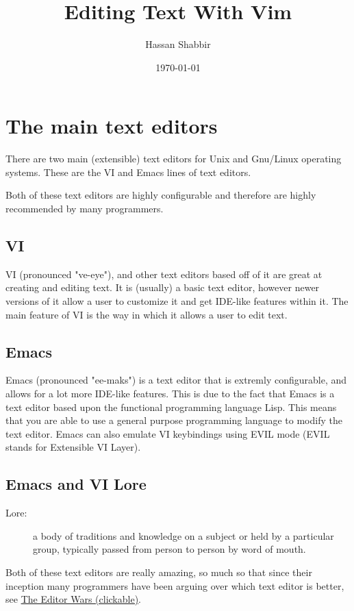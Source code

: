 \documentclass[11pt]{article}
\author{Hassan Shabbir}
\date{\today}
\title{Editing Text With Vim}
\begin{document}
\maketitle
\tableofcontents

\newpage
\section{The main text editors}
\label{sec:org91c0bff}
There are two main (extensible) text editors for Unix and Gnu/Linux operating
systems. These are the VI and Emacs lines of text editors.

Both of these text editors are highly configurable and therefore are highly
recommended by many programmers.
\subsection{VI}
\label{sec:org9a38c04}
VI (pronounced "ve-eye"), and other text editors based off of it are great at
creating and editing text. It is (usually) a basic text editor, however newer
versions of it allow a user to customize it and get IDE-like features within it.
The main feature of VI is the way in which it allows a user to edit text.
\subsection{Emacs}
\label{sec:org1f6a91e}
Emacs (pronounced "ee-maks") is a text editor that is extremly configurable, and
allows for a lot more IDE-like features. This is due to the fact that Emacs is a
text editor based upon the functional programming language Lisp. This means that
you are able to use a general purpose programming language to modify the text
editor. Emacs can also emulate VI keybindings using EVIL mode (EVIL stands for
Extensible VI Layer).
\subsection{Emacs and VI Lore}
\label{sec:org64bf6e6}
\begin{description}
\item[{Lore:}] a body of traditions and knowledge on a subject or held by a particular group,
typically passed from person to person by word of mouth.
\end{description}

Both of these text editors are really amazing, so much so that since their
inception many programmers have been arguing over which text editor is better,
see \href{https://en.wikipedia.org/wiki/Editor\_war}{The Editor Wars (clickable)}.
\end{document}
